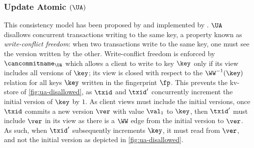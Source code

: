 \subsubsection{Update Atomic \((\UA)\)}
This consistency model has been proposed by \citet{framework-concur} 
and implemented by \citet{rola}.
\(\UA\) disallows concurrent transactions writing to the same key,
a property known as \emph{write-conflict freedom}:  
when two transactions write to the same key, one must see the version 
written by the other.
Write-conflict freedom is enforced by \(\cancommitname_{\UA}\) which allows a client to write to key \(\key\) only if its view includes all versions of \(\key\); 
\ie its view is closed with respect to the \(\WW^{-1}(\key)\) relation for all keys \(\key\) written in the fingerprint \(\fp\).
This prevents the kv-store of \cref{fig:ua-disallowed},
as \(\txid\) and \(\txid'\) concurrently increment the initial version of \(\key\) by \(1\).
As client views must include the initial versions, once \(\txid\) commits a new version \(\ver\) with value \(\val_1\) to \(\key\), then \(\txid'\) must include \(\ver\) in its view as there is a \(\WW\) edge from the initial version to \(\ver\). 
As such, when \(\txid'\) subsequently increments \(\key\), it must read from \(\ver\), and not the initial version as depicted in \cref{fig:ua-disallowed}.



